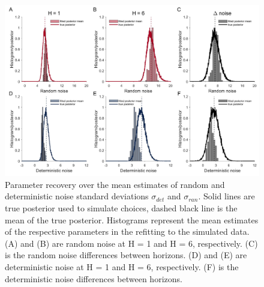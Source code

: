 \documentclass[12pt]{article}
\begin{document}
	\newpage
	\begin{figure}[H]
		\begin{center}
			\includegraphics[width=1\textwidth]{figures/RDBayes_parameterrecovery_hyperprior.jpg}
			\caption{Parameter recovery over the mean estimates of random and deterministic noise standard deviations $\sigma_{det}$ and $\sigma_{ran}$. Solid lines are true posterior used to simulate choices, dashed black line is the mean of the true posterior. Histograms represent the mean estimates of the respective parameters in the refitting to the simulated data. (A) and (B) are random noise at H = 1 and H = 6, respectively. (C) is the random noise differences between horizons. (D) and (E) are deterministic noise at H = 1 and H = 6, respectively. (F) is the deterministic noise differences between horizons.}
			\label{fig:s4}
		\end{center}
	\end{figure}

\newpage
\end{document}
